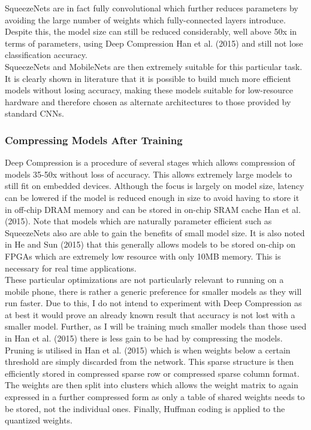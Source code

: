 \documentclass{article}
\begin{document}
SqueezeNets are in fact fully convolutional which further reduces parameters by avoiding the large number of weights which fully-connected layers introduce. Despite this, the model size can still be reduced considerably, well above 50x in terms of parameters, using Deep Compression  Han et al. (2015) and still not lose classification accuracy.\\

SqueezeNets and MobileNets are then extremely suitable for this particular task. It is clearly shown in  literature that it is possible to build much more efficient models without losing accuracy, making these models suitable for low-resource hardware and therefore chosen as alternate architectures to those provided by standard CNNs. \\
\subsubsection{Compressing Models After Training}

Deep Compression is a procedure of several stages which allows compression of models 35-50x without loss of accuracy. This allows extremely large models to still fit on embedded devices. Although the focus is largely on model size, latency can be lowered if the model is reduced enough in size to avoid having to store it in off-chip DRAM memory and can be stored in on-chip SRAM cache Han et al. (2015). Note that models which are naturally parameter efficient such as SqueezeNets also are able to gain the benefits of small model size. It is also noted in He and Sun (2015) that this generally allows models to be stored on-chip on FPGAs which are extremely low resource with only 10MB memory. This is necessary for real time applications.\\

These particular optimizations are not particularly relevant to running on a mobile phone, there is rather a generic preference for smaller models as they will run faster. Due to this, I do not intend to experiment with Deep Compression as at best it would prove an already known result that accuracy is not lost with a smaller model. Further, as I will be training much smaller models than those used in Han et al. (2015) there is less gain to be had by compressing the models. \\

Pruning is utilised in Han et al. (2015) which is when weights below a certain threshold are simply discarded from the network. This sparse structure is then efficiently stored in compressed sparse row or compressed sparse column format. The weights are then split into clusters which allows the weight matrix to again expressed in a further compressed form as only a table of shared weights needs to be stored, not the individual ones. Finally, Huffman coding is applied to the quantized weights.\\
\end{document}

